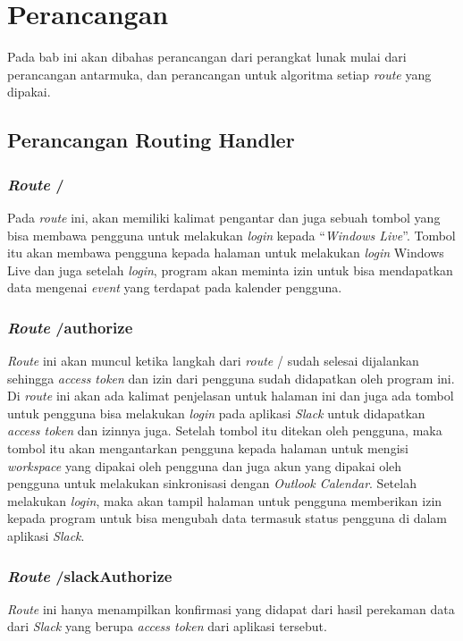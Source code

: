 \chapter{Perancangan}
\label{chap:perancangan}

Pada bab ini akan dibahas perancangan dari perangkat lunak mulai dari perancangan antarmuka, dan perancangan untuk algoritma setiap \textit{route} yang dipakai. 

\section{Perancangan Routing Handler}
\subsection{\textit{Route} /}
Pada \textit{route} ini, akan memiliki kalimat pengantar dan juga sebuah tombol yang bisa membawa pengguna untuk melakukan \textit{login} kepada ``\textit{Windows Live}''. Tombol itu akan membawa pengguna kepada halaman untuk melakukan \textit{login} Windows Live dan juga setelah \textit{login}, program akan meminta izin untuk bisa mendapatkan data mengenai \textit{event} yang terdapat pada kalender pengguna.

\subsection{\textit{Route} /authorize}
\textit{Route} ini akan muncul ketika langkah dari \textit{route} / sudah selesai dijalankan sehingga \textit{access token} dan izin dari pengguna sudah didapatkan oleh program ini. Di \textit{route} ini akan ada kalimat penjelasan untuk halaman ini dan juga ada tombol untuk pengguna bisa melakukan \textit{login} pada aplikasi \textit{Slack} untuk didapatkan \textit{access token} dan izinnya juga. Setelah tombol itu ditekan oleh pengguna, maka tombol itu akan mengantarkan pengguna kepada halaman untuk mengisi \textit{workspace} yang dipakai oleh pengguna dan juga akun yang dipakai oleh pengguna untuk melakukan sinkronisasi dengan \textit{Outlook Calendar}. Setelah melakukan \textit{login}, maka akan tampil halaman untuk pengguna memberikan izin kepada program untuk bisa mengubah data termasuk status pengguna di dalam aplikasi \textit{Slack}. 

\subsection{\textit{Route} /slackAuthorize}
\textit{Route} ini hanya menampilkan konfirmasi yang didapat dari hasil perekaman data dari \textit{Slack} yang berupa \textit{access token} dari aplikasi tersebut. 

